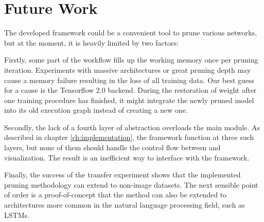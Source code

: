 \section{Future Work}
The developed framework could be a convenient tool to prune various networks, but at the moment, it is heavily limited by two factors:

Firstly, some part of the workflow fills up the working memory once per pruning iteration. Experiments with massive architectures or great pruning depth may cause a memory failure resulting in the loss of all training data. Our best guess for a cause is the Tensorflow 2.0 backend. During the restoration of weight after one training procedure has finished, it might integrate the newly pruned model into its old execution graph instead of creating a new one.

Secondly, the lack of a fourth layer of abstraction overloads the main module. As described in chapter \ref{ch:implementation}, the framework function at three such layers, but none of them should handle the control flow between and visualization. The result is an inefficient way to interface with the framework.

Finally, the success of the transfer experiment shows that the implemented pruning methodology can extend to non-image datasets. The next sensible point of order is a proof-of-concept that the method can also be extended to architectures more common in the natural language processing field, such as LSTMs.

